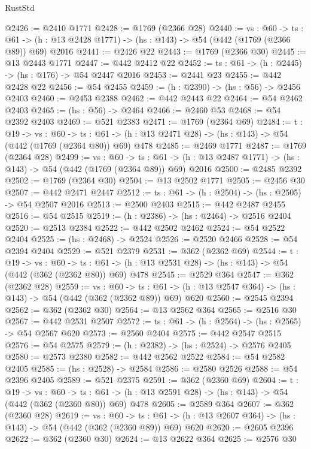 \begin{lexlean}{RustStd}
\begin{coremodule}
@2426 := @2410 @1771
@2428 := @1769 (@2366 @28)
@2440 := {vs : @60} ->
  {ts : @61} -> (h : @13 @2428 @1771) -> (hs : @143) -> @54 (@442 (@1769 (@2366 @89)) @69) @2016
@2441 := @2426 @22
@2443 := @1769 (@2366 @30)
@2445 := @13 @2443 @1771
@2447 := @442 @2412 @22
@2452 := {ts : @61} -> (h : @2445) -> (hs : @176) -> @54 @2447 @2016
@2453 := @2441 @23
@2455 := @442 @2428 @22
@2456 := @54 @2455
@2459 := (h : @2390) -> (hs : @56) -> @2456 @2403
@2460 := @2453 @2388
@2462 := @442 @2443 @22
@2464 := @54 @2462 @2403
@2465 := (hs : @56) -> @2464
@2466 := @2460 @53
@2468 := @54 @2392 @2403
@2469 := @521 @2383
@2471 := @1769 (@2364 @69)
@2484 := {t : @19} ->
  {vs : @60} ->
  {ts : @61} -> (h : @13 @2471 @28) -> (hs : @143) -> @54 (@442 (@1769 (@2364 @80)) @69) @478
@2485 := @2469 @1771
@2487 := @1769 (@2364 @28)
@2499 := {vs : @60} ->
  {ts : @61} -> (h : @13 @2487 @1771) -> (hs : @143) -> @54 (@442 (@1769 (@2364 @89)) @69) @2016
@2500 := @2485 @2392
@2502 := @1769 (@2364 @30)
@2504 := @13 @2502 @1771
@2505 := @2456 @30
@2507 := @442 @2471 @2447
@2512 := {ts : @61} -> (h : @2504) -> (hs : @2505) -> @54 @2507 @2016
@2513 := @2500 @2403
@2515 := @442 @2487 @2455
@2516 := @54 @2515
@2519 := (h : @2386) -> (hs : @2464) -> @2516 @2404
@2520 := @2513 @2384
@2522 := @442 @2502 @2462
@2524 := @54 @2522 @2404
@2525 := (hs : @2468) -> @2524
@2526 := @2520 @2466
@2528 := @54 @2394 @2404
@2529 := @521 @2379
@2531 := @362 (@2362 @69)
@2544 := {t : @19} ->
  {vs : @60} ->
  {ts : @61} -> (h : @13 @2531 @28) -> (hs : @143) -> @54 (@442 (@362 (@2362 @80)) @69) @478
@2545 := @2529 @364
@2547 := @362 (@2362 @28)
@2559 := {vs : @60} ->
  {ts : @61} -> (h : @13 @2547 @364) -> (hs : @143) -> @54 (@442 (@362 (@2362 @89)) @69) @620
@2560 := @2545 @2394
@2562 := @362 (@2362 @30)
@2564 := @13 @2562 @364
@2565 := @2516 @30
@2567 := @442 @2531 @2507
@2572 := {ts : @61} -> (h : @2564) -> (hs : @2565) -> @54 @2567 @620
@2573 := @2560 @2404
@2575 := @442 @2547 @2515
@2576 := @54 @2575
@2579 := (h : @2382) -> (hs : @2524) -> @2576 @2405
@2580 := @2573 @2380
@2582 := @442 @2562 @2522
@2584 := @54 @2582 @2405
@2585 := (hs : @2528) -> @2584
@2586 := @2580 @2526
@2588 := @54 @2396 @2405
@2589 := @521 @2375
@2591 := @362 (@2360 @69)
@2604 := {t : @19} ->
  {vs : @60} ->
  {ts : @61} -> (h : @13 @2591 @28) -> (hs : @143) -> @54 (@442 (@362 (@2360 @80)) @69) @478
@2605 := @2589 @364
@2607 := @362 (@2360 @28)
@2619 := {vs : @60} ->
  {ts : @61} -> (h : @13 @2607 @364) -> (hs : @143) -> @54 (@442 (@362 (@2360 @89)) @69) @620
@2620 := @2605 @2396
@2622 := @362 (@2360 @30)
@2624 := @13 @2622 @364
@2625 := @2576 @30

\end{coremodule}
\end{lexlean}

